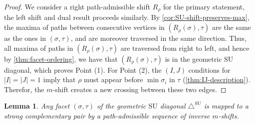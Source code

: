 \documentclass{amsart}
\newtheorem{lemma}[theorem]{Lemma}
\theoremstyle{definition}
\newcommand{\SU}{\mathrm{SU}}
\newcommand{\SUD}{\triangle^{\mathrm{SU}}}
\begin{document}
\begin{proof}
We consider a right path-admissible shift $R_\rho$ for the primary statement, the left shift and dual result proceeds similarly. 
By \cref{cor:SU-shift-preserves-max}, the maxima of paths between consecutive vertices in $(R_{\rho}(\sigma),\tau)$ are the same as the ones in $(\sigma,\tau)$, and are moreover traversed in the same direction.
Thus, all maxima of paths in $(R_{\rho}(\sigma),\tau)$ are traversed from right to left, and hence by \cref{thm:facet-ordering}, we have that $(R_{\rho}(\sigma),\tau)$ is in the geometric $\SU$ diagonal, which proves Point (1).
For Point (2), the $(I,J)$ conditions for $|I|=|J|=1$ imply that $\rho$ must appear before $\min \sigma_i$ in $\tau$ (\cref{thm:IJ-description}).
Therefor, the $m$-shift creates a new crossing between these two edges.
\end{proof}

\begin{lemma}
\label{lem:inverse-to-SCP}
Any facet $(\sigma,\tau)$ of the geometric $\SU$ diagonal $\SUD$ is mapped to a strong complementary pair by a path-admissible sequence of inverse $m$-shifts.
\end{lemma}
\end{document}

